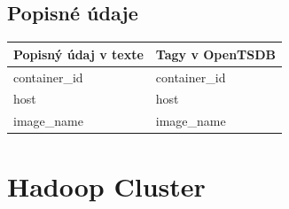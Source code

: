 \documentclass[printed,11pt,twoside,color,cover,table]{fithesis3}
\begin{document}
\begin{appendices}
\subsection{Popisné údaje}
\begin{center}
     \begin{tabular}{| l | l |}
    \hline
    Popisný údaj v texte & Tagy v OpenTSDB \\ \hline
    container\_id & container\_id\\ \hline
    host & host\\ \hline
    image\_name & image\_name\\ \hline
    \end{tabular}
\end{center}

\section{Hadoop Cluster}

\end{appendices}
\end{document}
